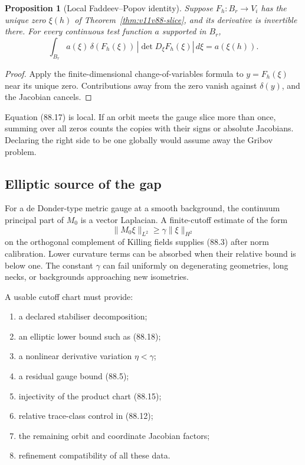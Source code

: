 \documentclass[11pt]{article}
\newtheorem{proposition}[theorem]{Proposition}
\begin{document}
\begin{proposition}[Local Faddeev--Popov identity]
\label{prop:v11v88-delta}
Suppose \(F_h:B_r\to V_i\) has the unique zero \(\xi(h)\) of
Theorem~\ref{thm:v11v88-slice}, and its derivative is invertible
there.  For every continuous test function \(a\) supported in \(B_r\),
\[
 \int_{B_r}a(\xi)\,
       \delta(F_h(\xi))\,|\det D_\xi F_h(\xi)|\,d\xi
                         =a(\xi(h)).                         \tag{88.17}
\]
\end{proposition}

\begin{proof}
Apply the finite-dimensional change-of-variables formula to
\(y=F_h(\xi)\) near its unique zero.  Contributions away from the
zero vanish against \(\delta(y)\), and the Jacobian cancels.
\end{proof}

Equation (88.17) is local.  If an orbit meets the gauge slice more
than once, summing over all zeros counts the copies with their signs
or absolute Jacobians.  Declaring the right side to be one globally
would assume away the Gribov problem.

\subsection{Elliptic source of the gap}

For a de Donder-type metric gauge at a smooth background, the
continuum principal part of \(M_0\) is a vector Laplacian.  A
finite-cutoff estimate of the form
\[
 \|M_0\xi\|_{L^2}\ge\gamma\|\xi\|_{H^2}                     \tag{88.18}
\]
on the orthogonal complement of Killing fields supplies (88.3) after
norm calibration.  Lower curvature terms can be absorbed when their
relative bound is below one.  The constant \(\gamma\) can fail
uniformly on degenerating geometries, long necks, or backgrounds
approaching new isometries.

\begin{ledger}
\label{led:v11v88-inputs}
A usable cutoff chart must provide:
\begin{enumerate}
\item a declared stabiliser decomposition;
\item an elliptic lower bound such as (88.18);
\item a nonlinear derivative variation \(\eta<\gamma\);
\item a residual gauge bound (88.5);
\item injectivity of the product chart (88.15);
\item relative trace-class control in (88.12);
\item the remaining orbit and coordinate Jacobian factors;
\item refinement compatibility of all these data.
\end{enumerate}
\end{ledger}
\end{document}
